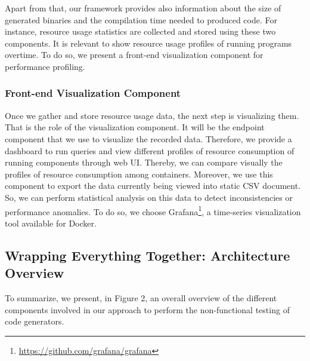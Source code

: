 Apart from that, our framework provides also information about the size of generated binaries and the compilation time needed to produced code.
For instance, resource usage statistics are collected and stored using these two components. It is relevant to show resource usage profiles of running programs overtime. To do so, we present a front-end visualization component for performance profiling. 

\subsubsection{Front-end Visualization Component}
Once we gather and store resource usage data, the next step is visualizing them. That is the role of the visualization component. It will be the endpoint component that we use to visualize the recorded data. Therefore, we provide a dashboard to run queries and view different profiles of resource consumption of running components through web UI. Thereby, we can compare visually the profiles of resource consumption among containers. Moreover, we use this component to export the data currently being viewed into static CSV document. So, we can perform statistical analysis on this data to detect inconsistencies or performance anomalies.
To do so, we choose Grafana\footnote{\url{https://github.com/grafana/grafana}}, a time-series visualization tool available for Docker. 

\subsection{Wrapping Everything Together: Architecture Overview}
To summarize, we present, in Figure 2, an overall overview of the different components involved in our approach to perform the non-functional testing of code generators.

